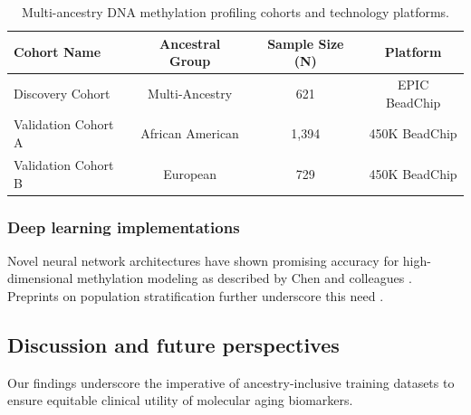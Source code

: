 \begin{table}[htb]
  \centering
  \caption{Multi-ancestry DNA methylation profiling cohorts and technology platforms.}
  \begin{tabular}{lccc}
    \toprule
    \textbf{Cohort Name} & \textbf{Ancestral Group} & \textbf{Sample Size (N)} & \textbf{Platform} \\
    \midrule
    Discovery Cohort & Multi-Ancestry & 621 & EPIC BeadChip \\
    Validation Cohort A & African American & 1,394 & 450K BeadChip \\
    Validation Cohort B & European & 729 & 450K BeadChip \\
    \bottomrule
  \end{tabular}
\end{table}

\subsubsection{Deep learning implementations}

Novel neural network architectures have shown promising accuracy for high-dimensional methylation modeling as described by Chen and colleagues \cite{Pubmed2024}. Preprints on population stratification further underscore this need \cite{Biorxiv2023}.

\subsection{Discussion and future perspectives}

Our findings underscore the imperative of ancestry-inclusive training datasets to ensure equitable clinical utility of molecular aging biomarkers.
